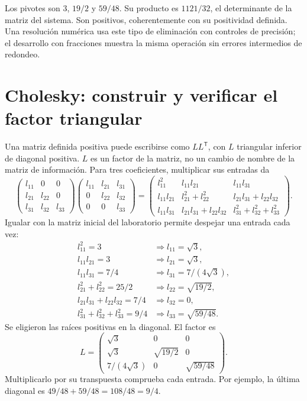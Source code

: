 \documentclass[11pt,a4paper]{article}
\newcommand{\T}{^{\mathsf T}}
\begin{document}
Los pivotes son $3$, $19/2$ y $59/48$.
Su producto es $1121/32$, el determinante de la matriz del sistema.
Son positivos, coherentemente con su positividad definida.
Una resolución numérica usa este tipo de eliminación con controles
de precisión; el desarrollo con fracciones muestra la misma operación
sin errores intermedios de redondeo.

\clearpage
\section{Cholesky: construir y verificar el factor triangular}\label{logit44}
Una matriz definida positiva puede escribirse como $LL\T$,
con $L$ triangular inferior de diagonal positiva.
$L$ es un factor de la matriz, no un cambio de nombre
de la matriz de información.
Para tres coeficientes, multiplicar sus entradas da
\[
\begin{pmatrix}l_{11}&0&0\\l_{21}&l_{22}&0\\l_{31}&l_{32}&l_{33}\end{pmatrix}
\begin{pmatrix}l_{11}&l_{21}&l_{31}\\0&l_{22}&l_{32}\\0&0&l_{33}\end{pmatrix}
=
\begin{pmatrix}
l_{11}^2&l_{11}l_{21}&l_{11}l_{31}\\
l_{11}l_{21}&l_{21}^2+l_{22}^2&l_{21}l_{31}+l_{22}l_{32}\\
l_{11}l_{31}&l_{21}l_{31}+l_{22}l_{32}&l_{31}^2+l_{32}^2+l_{33}^2
\end{pmatrix}.
\]
Igualar con la matriz inicial del laboratorio permite despejar
una entrada cada vez:
\[
\begin{aligned}
l_{11}^2=3&\Rightarrow l_{11}=\sqrt3,\\
l_{11}l_{21}=3&\Rightarrow l_{21}=\sqrt3,\\
l_{11}l_{31}=7/4&\Rightarrow l_{31}=7/(4\sqrt3),\\
l_{21}^2+l_{22}^2=25/2&\Rightarrow l_{22}=\sqrt{19/2},\\
l_{21}l_{31}+l_{22}l_{32}=7/4&\Rightarrow l_{32}=0,\\
l_{31}^2+l_{32}^2+l_{33}^2=9/4&\Rightarrow l_{33}=\sqrt{59/48}.
\end{aligned}
\]
Se eligieron las raíces positivas en la diagonal.
El factor es
\[
L=\begin{pmatrix}
\sqrt3&0&0\\
\sqrt3&\sqrt{19/2}&0\\
7/(4\sqrt3)&0&\sqrt{59/48}
\end{pmatrix}.
\]
Multiplicarlo por su transpuesta comprueba cada entrada.
Por ejemplo, la última diagonal es $49/48+59/48=108/48=9/4$.
\end{document}
